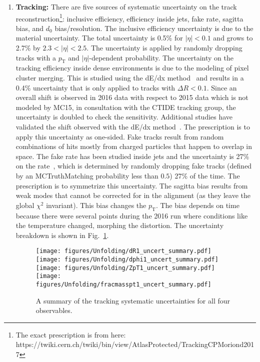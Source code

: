 \begin{enumerate}
  \item \textbf{Tracking:} There are five sources of systematic uncertainty on the track reconstruction\footnote{The exact prescription is from here: https://twiki.cern.ch/twiki/bin/view/AtlasProtected/TrackingCPMoriond2017}: inclusive efficiency, efficiency inside jets, fake rate, sagitta bias, and $d_0$ bias/resolution.  The inclusive efficiency uncertainty is due to the material uncertainty.  The total uncertainty is 0.5\% for $|\eta| < 0.1$ and grows to 2.7\% by $2.3 < |\eta| < 2.5$.  The uncertainty is applied by randomly dropping tracks with a $p_\text{T}$ and $|\eta|$-dependent probability.  The uncertainty on the tracking efficiency inside dense environments is due to the modeling of pixel cluster merging.  This is studied using the dE/dx method~\cite{Aaboud:2017all,ATL-PHYS-PUB-2016-007} and results in a 0.4\% uncertainty that is only applied to tracks with $\Delta R < 0.1$.  Since an overall shift is observed in 2016 data with respect to 2015 data which is not modeled by MC15, in consultation with the CTIDE tracking group, the uncertainty is doubled to check the sensitivity.  Additional studies have validated the shift observed with the dE/dx method~\cite{ATL-PHYS-PUB-2017-016}.  The prescription is to apply this uncertainty as one-sided.  Fake tracks result from random combinations of hits mostly from charged particles that happen to overlap in space.   The fake rate has been studied inside jets and the uncertainty is 27\% on the rate~\cite{ATL-PHYS-PUB-2017-016}, which is determined by randomly dropping fake tracks (defined by an MCTruthMatching probability less than $0.5$) 27\% of the time.  The prescription is to symmetrize this uncertainty. The sagitta bias results from weak modes that cannot be corrected for in the alignment (as they leave the global $\chi^2$ invariant).  This bias changes the $p_\text{T}$.  The bias depends on time because there were several points during the 2016 run where conditions like the temperature changed, morphing the distortion.   The uncertainty breakdown is shown in Fig.~\ref{fig:syst_overview_deltaR1}.  %
  
    \begin{figure}[htpb!]
\begin{center}
\texttt{[image: figures/Unfolding/dR1\_uncert\_summary.pdf]}\texttt{[image: figures/Unfolding/dphi1\_uncert\_summary.pdf]}\\
\texttt{[image: figures/Unfolding/ZpT1\_uncert\_summary.pdf]}\texttt{[image: figures/Unfolding/fracmasspt1\_uncert\_summary.pdf]}
\caption[]{A summary of the tracking systematic uncertainties for all four observables. } 
\label{fig:syst_overview_deltaR1}
\end{center}
\end{figure}
  
\end{enumerate}

